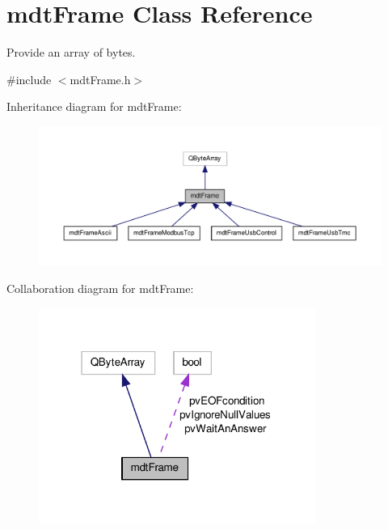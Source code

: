 \hypertarget{classmdt_frame}{\section{mdt\-Frame Class Reference}
\label{classmdt_frame}
}


Provide an array of bytes.  




{\ttfamily \#include $<$mdt\-Frame.\-h$>$}



Inheritance diagram for mdt\-Frame\-:
\nopagebreak
\begin{figure}[H]
\begin{center}
\leavevmode
\includegraphics[width=350pt]{classmdt_frame__inherit__graph}
\end{center}
\end{figure}


Collaboration diagram for mdt\-Frame\-:
\nopagebreak
\begin{figure}[H]
\begin{center}
\leavevmode
\includegraphics[width=256pt]{classmdt_frame__coll__graph}
\end{center}
\end{figure}
